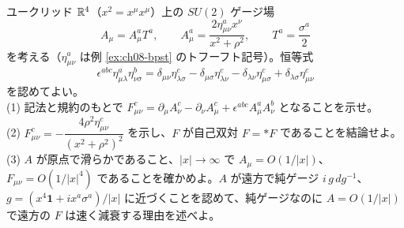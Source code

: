 \begin{problem}[難易度 C]\label{ch08-prob-bpst1}
ユークリッド $\mathbb{R}^4$（$x^2=x^\mu x^\mu$）上の $SU(2)$ ゲージ場
\[
A_\mu=A_\mu^aT^a,\qquad A^a_\mu=\frac{2\eta^a_{\mu\nu}x^\nu}{x^2+\rho^2},\qquad T^a=\frac{\sigma^a}{2}
\]
を考える（$\eta^a_{\mu\nu}$ は例 \ref{ex:ch08-bpst} のトフーフト記号）。恒等式
\[
\epsilon^{abc}\eta^a_{\mu\lambda}\eta^b_{\nu\sigma}=\delta_{\mu\nu}\eta^c_{\lambda\sigma}-\delta_{\mu\sigma}\eta^c_{\lambda\nu}-\delta_{\lambda\nu}\eta^c_{\mu\sigma}+\delta_{\lambda\sigma}\eta^c_{\mu\nu}
\]
を認めてよい。\\
(1) 記法と規約のもとで $F^c_{\mu\nu}=\partial_\mu A^c_\nu-\partial_\nu A^c_\mu+\epsilon^{abc}A^a_\mu A^b_\nu$ となることを示せ。\\
(2) $F^c_{\mu\nu}=-\dfrac{4\rho^2\eta^c_{\mu\nu}}{(x^2+\rho^2)^2}$ を示し、$F$ が自己双対 $F=*F$ であることを結論せよ。\\
(3) $A$ が原点で滑らかであること、$\lvert x\rvert\to\infty$ で $A_\mu=O(1/\lvert x\rvert)$、$F_{\mu\nu}=O(1/\lvert x\rvert^4)$ であることを確かめよ。$A$ が遠方で純ゲージ $i\,g\,dg^{-1}$、$g=(x^4\mathbf 1+ix^a\sigma^a)/\lvert x\rvert$ に近づくことを認めて、純ゲージなのに $A=O(1/\lvert x\rvert)$ で遠方の $F$ は速く減衰する理由を述べよ。
\end{problem}

